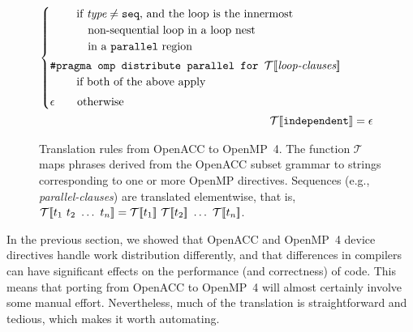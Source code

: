 \documentclass{sig-alternate-05-2015}
\begin{document}
\begin{figure*}
\begin{align*}
\begin{cases}
        \hspace*{2em} \textup{ if $\textit{type} \neq \texttt{seq}$, and the loop is the innermost} \\
        \hspace*{3em} \textup{ non-sequential loop in a loop nest} \\
        \hspace*{3em} \textup{ in a \texttt{parallel} region} \vspace*{.25em} \\
   \texttt{\#pragma omp distribute parallel for\ }\translate{\textit{loop-clauses}} \\
        \hspace*{2em} \textup{ if both of the above apply} \vspace*{.33em} \\
   \epsilon
        \hspace*{1.65em} \textup{ otherwise} \\
   \end{cases} \\
%
\translate{\texttt{independent}} &=
   \epsilon \\
%
\end{align*}
\caption{Translation rules from OpenACC to OpenMP~4.  The function
$\mathcal{T}$ maps phrases derived from the OpenACC subset grammar to
strings corresponding to one or more OpenMP directives.  Sequences
(e.g., \textit{parallel-clauses}) are translated elementwise, that is,
$\translate{t_1\ t_2\ \dots\ t_n} =
\translate{t_1}\ \translate{t_2}\ \dots\ \translate{t_n}$.}
\label{fig:rules}
\end{figure*}

In the previous section, we showed that OpenACC and OpenMP~4 device directives
handle work distribution differently, and that differences in compilers can
have significant effects on the performance (and correctness) of code.  This
means that porting from OpenACC to OpenMP~4 will almost certainly involve
some manual effort.  Nevertheless, much of the translation is straightforward
and tedious, which makes it worth automating.
\end{document}
